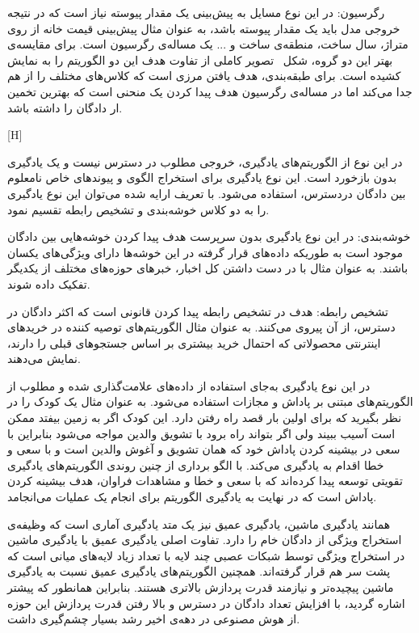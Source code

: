  رگرسیون: در این نوع مسایل به پیش‌بینی یک مقدار پیوسته نیاز است که در نتیجه خروجی مدل باید یک مقدار پیوسته باشد، به عنوان مثال پیش‌بینی قیمت خانه از روی متراژ، سال ساخت، منطقه‌ی ساخت و ... یک مساله‌ی رگرسیون است.
برای مقایسه‌ی بهتر این دو گروه، شکل~ تصویر کاملی از تفاوت هدف این دو الگوریتم را به نمایش کشیده است. برای طبقه‌بندی، هدف یافتن مرزی است که کلاس‌های مختلف را از هم جدا می‌کند اما در مساله‌ی رگرسیون هدف پیدا کردن یک منحنی است که بهترین تخمین ار دادگان را داشته باشد.

[H]

در این نوع از الگوریتم‌های یادگیری، خروجی مطلوب در دسترس نیست و یک یادگیری بدون بازخورد است. این نوع یادگیری برای استخراج الگوی و پیوندهای خاص نامعلوم بین دادگان دردسترس، استفاده می‌شود. با تعریف ارایه شده می‌توان این نوع یادگیری را به دو کلاس خوشه‌بندی و تشخیص رابطه تقسیم نمود.

 خوشه‌بندی: در این نوع یادگیری بدون سرپرست هدف پیدا کردن خوشه‌هایی بین دادگان موجود است به ‌طوریکه داده‌های قرار گرفته در این خوشه‌ها دارای ویژگی‌های یکسان باشند. به عنوان مثال با در دست داشتن کل اخبار، خبر‌های حوزه‌های مختلف از یکدیگر تفکیک داده شوند.

 تشخیص رابطه: هدف در تشخیص رابطه پیدا کردن قانونی است که اکثر دادگان در دسترس، از آن پیروی می‌کنند. به عنوان مثال الگوریتم‌های توصیه کننده در خرید‌های اینترنتی محصولاتی که احتمال خرید بیشتری بر اساس جستجوهای قبلی را دارند، نمایش می‌دهند.

در این نوع یادگیری به‌جای استفاده از داده‌های علامت‌گذاری شده و مطلوب از الگوریتم‌های مبتنی بر پاداش و مجازات استفاده می‌شود. به عنوان مثال یک کودک را در نظر بگیرید که برای اولین بار قصد راه رفتن دارد. این کودک اگر به زمین بیفتد ممکن است آسیب ببیند ولی اگر بتواند راه برود با تشویق والدین مواجه می‌شود بنابراین با سعی در بیشینه کردن پاداش خود که همان تشویق و آغوش والدین است و با سعی و خطا اقدام به یادگیری می‌کند. با الگو برداری از چنین روندی الگوریتم‌های یادگیری تقویتی توسعه پیدا کرده‌اند که با سعی و خطا و مشاهدات فراوان، هدف بیشینه کردن پاداش است که در نهایت به یادگیری الگوریتم برای انجام یک عملیات می‌انجامد. 

همانند یادگیری ماشین، یادگیری عمیق نیز یک متد یادگیری آماری است که وظیفه‌ی استخراج ویژگی از دادگان خام را دارد. تفاوت اصلی یادگیری عمیق با یادگیری ماشین در استخراج ویژگی توسط شبکات عصبی چند لایه با تعداد زیاد لایه‌های میانی است که پشت سر هم قرار گرفته‌اند. همچنین الگوریتم‌های یادگیری عمیق نسبت به یادگیری ماشین پیچیده‌تر و نیازمند قدرت پردازش بالاتری هستند. بنابراین همانطور که پیشتر اشاره گردید، با افزایش تعداد دادگان در دسترس و بالا رفتن قدرت پردازش این حوزه از هوش مصنوعی در دهه‌ی اخیر رشد بسیار چشم‌گیری داشت.

